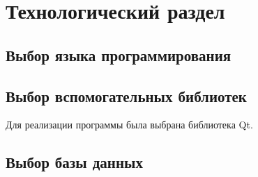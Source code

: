 \chapter{Технологический раздел}
\label{cha:impl}
\section{Выбор  языка программирования}

\section{Выбор вспомогательных библиотек}
Для реализации программы была выбрана библиотека Qt.

\section{Выбор базы данных}






